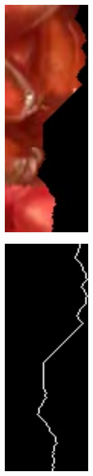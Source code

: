 \documentclass[a4paper,12pt]{article}
\begin{document}
      \begin{figure}[H]
     	\centering
     	\begin{subfigure}{0.2\textwidth}
     		\centering
     		\includegraphics[width=0.4\textwidth]{15.jpg}
     	\end{subfigure}%
     	\begin{subfigure}{0.2\textwidth}
     		\centering
     		\includegraphics[width=0.4\textwidth]{14.jpg}
     	\end{subfigure}%
     \end{figure}
\end{document}
